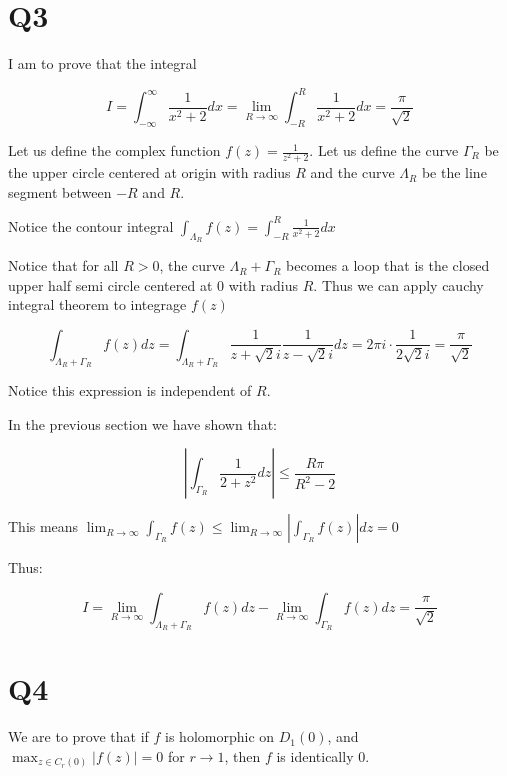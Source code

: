 \documentclass[12pt, a4paper]{article}
\theoremstyle{definition}
\theoremstyle{remark}
\begin{document}
\section{Q3} %
\label{sec:Q3}

I am to prove that the integral 

\[
  I = \displaystyle\int_{-\infty}^{\infty} \frac{1}{x^2+2} dx = \lim_{R \rightarrow \infty} \int_{-R}^{R} \frac{1}{x^2+2} dx= \frac{\pi}{\sqrt{2}} 
\]

Let us define the complex function $f(z) = \frac{1}{z^2 + 2}$. Let us define the curve $\Gamma_R$ be the upper circle centered at origin with radius $R$ and the curve $\Lambda_R$ be the line segment between $-R$ and $R$. 

Notice the contour integral $\int_{\Lambda_R} f(z) = \int_{-R}^{R} \frac{1}{x^2+2}dx$

Notice that for all $R > 0$, the curve $\Lambda_R + \Gamma_R$ becomes a loop that is the closed upper half semi circle centered at $0$ with radius $R$. 
Thus we can apply cauchy integral theorem to integrage $f(z)$ 

\[
  \int_{\Lambda_R +  \Gamma_R} f(z) dz = \int_{\Lambda_R + \Gamma_R}  \frac{1}{z+\sqrt{2} i} \frac{1}{z- \sqrt{2} i} dz= 2\pi i \cdot \frac{1}{2\sqrt{2}i} = \frac{\pi}{\sqrt{2}}
\]

Notice this expression is independent of $R$.

In the previous section we have shown that:

\[
  \left| \int_{\Gamma_{R}} \frac{1}{2+z^2} dz \right| \leq \frac{R\pi}{R^2-2} 
\]

This means $\lim_{R \rightarrow \infty} \int_{\Gamma_R} f(z) \leq \lim_{R \rightarrow \infty} | \int_{\Gamma_R} f(z)| dz = 0$ 

Thus:

\[
  I = \lim_{R \rightarrow \infty} \int_{\Lambda_R +  \Gamma_R} f(z)dz - \lim_{R \rightarrow \infty} \int_{\Gamma_R} f(z) dz= \frac{\pi}{\sqrt{2}} 
\]


\section{Q4} %
\label{sec:Q4}

We are to prove that if  $f$ is holomorphic on $D_1(0)$, and $\max_{z\in C_r(0)}|f(z)| = 0$ for $r \rightarrow 1$, then $f$ is identically 0. 
\end{document}
